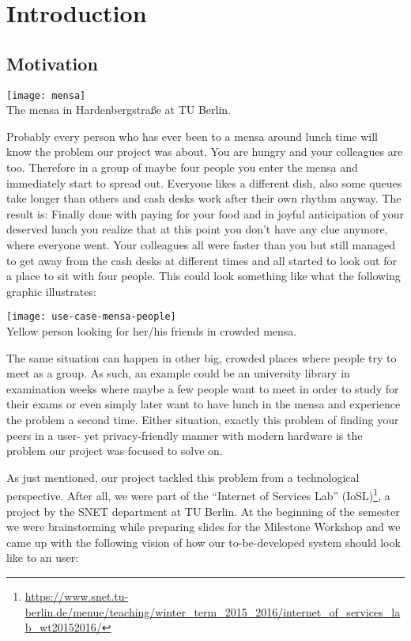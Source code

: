 \chapter{Introduction}
\label{cha:introduction}


\section{Motivation}

\begin{center}
    \texttt{[image: mensa]}\\
    The mensa in Hardenbergstraße at TU Berlin.
\end{center}

Probably every person who has ever been to a mensa around lunch time will know the problem our project was about. You are hungry and your colleagues are too. Therefore in a group of maybe four people you enter the mensa and immediately start to spread out. Everyone likes a different dish, also some queues take longer than others and cash desks work after their own rhythm anyway. The result is: Finally done with paying for your food and in joyful anticipation of your deserved lunch you realize that at this point you don't have any clue anymore, where everyone went. Your colleagues all were faster than you but still managed to get away from the cash desks at different times and all started to look out for a place to sit with four people. This could look something like what the following graphic illustrates:

\begin{center}
    \texttt{[image: use-case-mensa-people]}\\
    Yellow person looking for her/his friends in crowded mensa.
\end{center}

The same situation can happen in other big, crowded places where people try to meet as a group. As such, an example could be an university library in examination weeks where maybe a few people want to meet in order to study for their exams or even simply later want to have lunch in the mensa and experience the problem a second time. Either situation, exactly this problem of finding your peers in a user- yet privacy-friendly manner with modern hardware is the problem our project was focused to solve on.

As just mentioned, our project tackled this problem from a technological perspective. After all, we were part of the \enquote{Internet of Services Lab} (IoSL)\footnote{\url{https://www.snet.tu-berlin.de/menue/teaching/winter_term_2015_2016/internet_of_services_lab_wt20152016/}}, a project by the SNET department at TU Berlin. At the beginning of the semester we were brainstorming while preparing slides for the Milestone Workshop and we came up with the following vision of how our to-be-developed system should look like to an user:

